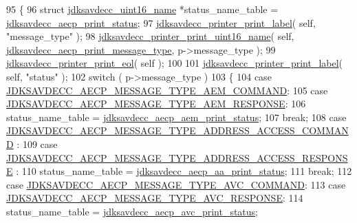 \begin{DoxyCode}
95 \{
96     \textcolor{keyword}{struct }\hyperlink{structjdksavdecc__uint16__name}{jdksavdecc\_uint16\_name} *status\_name\_table = 
      \hyperlink{group__aecp__print_ga3f478fcbbe933768f463bef56b4d98a8}{jdksavdecc\_aecp\_print\_status};
97     \hyperlink{group__util_gaf7818b24143b3c7502926a425a242ff5}{jdksavdecc\_printer\_print\_label}( \textcolor{keyword}{self}, \textcolor{stringliteral}{"message\_type"} );
98     \hyperlink{group__util_ga62486d864a66773d19bbbe23cebf346a}{jdksavdecc\_printer\_print\_uint16\_name}( \textcolor{keyword}{self}, 
      \hyperlink{group__aecp__print_gafc0c0a93f044f415ebcc499d3d7119a5}{jdksavdecc\_aecp\_print\_message\_type}, p->message\_type );
99     \hyperlink{group__util_gacda56c9d3d24593a52c999682fa6e6e3}{jdksavdecc\_printer\_print\_eol}( \textcolor{keyword}{self} );
100 
101     \hyperlink{group__util_gaf7818b24143b3c7502926a425a242ff5}{jdksavdecc\_printer\_print\_label}( \textcolor{keyword}{self}, \textcolor{stringliteral}{"status"} );
102     \textcolor{keywordflow}{switch} ( p->message\_type )
103     \{
104     \textcolor{keywordflow}{case} \hyperlink{group__aecp__message__type_ga4625ce189cc209f42deb0629f48faf69}{JDKSAVDECC\_AECP\_MESSAGE\_TYPE\_AEM\_COMMAND}:
105     \textcolor{keywordflow}{case} \hyperlink{group__aecp__message__type_ga9cad401e0f60634a8f084d93b0374d31}{JDKSAVDECC\_AECP\_MESSAGE\_TYPE\_AEM\_RESPONSE}:
106         status\_name\_table = \hyperlink{group__aecp__print_gadd819ed386f3ae5573685eb11ff930d9}{jdksavdecc\_aecp\_aem\_print\_status};
107         \textcolor{keywordflow}{break};
108     \textcolor{keywordflow}{case} \hyperlink{group__aecp__message__type_gab24ef3f0c1054f136d5c56c0c8bc3132}{JDKSAVDECC\_AECP\_MESSAGE\_TYPE\_ADDRESS\_ACCESS\_COMMAND}
      :
109     \textcolor{keywordflow}{case} \hyperlink{group__aecp__message__type_ga4d8df21361c95f23016e03d0ef625dc0}{JDKSAVDECC\_AECP\_MESSAGE\_TYPE\_ADDRESS\_ACCESS\_RESPONSE}
      :
110         status\_name\_table = \hyperlink{group__aecp__print_ga44190bbd7791bc071cd082a8d791b4d2}{jdksavdecc\_aecp\_aa\_print\_status};
111         \textcolor{keywordflow}{break};
112     \textcolor{keywordflow}{case} \hyperlink{group__aecp__message__type_gad297a615335f7d70d49993a0ee220dfd}{JDKSAVDECC\_AECP\_MESSAGE\_TYPE\_AVC\_COMMAND}:
113     \textcolor{keywordflow}{case} \hyperlink{group__aecp__message__type_gaa1d24ecbbabf5293fb3753a413a7ec8d}{JDKSAVDECC\_AECP\_MESSAGE\_TYPE\_AVC\_RESPONSE}:
114         status\_name\_table = \hyperlink{group__aecp__print_ga1d0387b1ab44b2bc836c369130ad7d7a}{jdksavdecc\_aecp\_avc\_print\_status};

\end{DoxyCode}
